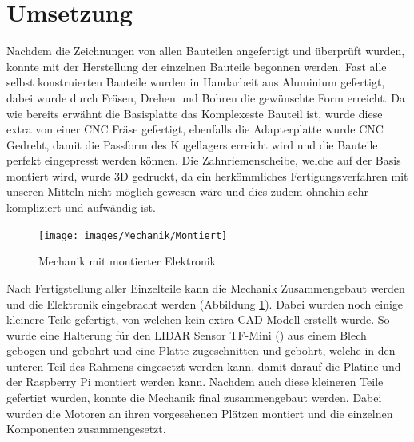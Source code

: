 \section{Umsetzung}
Nachdem die Zeichnungen von allen Bauteilen angefertigt und überprüft wurden, konnte mit der Herstellung der einzelnen Bauteile begonnen werden. Fast alle selbst konstruierten Bauteile wurden in Handarbeit aus Aluminium gefertigt, dabei wurde durch Fräsen, Drehen und Bohren die gewünschte Form erreicht. Da wie bereits erwähnt die Basisplatte das Komplexeste Bauteil ist, wurde diese extra von einer \ac{CNC} Fräse gefertigt, ebenfalls die Adapterplatte wurde \ac{CNC} Gedreht, damit die Passform des Kugellagers erreicht wird und die Bauteile perfekt eingepresst werden können. Die Zahnriemenscheibe, welche auf der Basis montiert wird, wurde \ac{3D} gedruckt, da ein herkömmliches Fertigungsverfahren mit unseren Mitteln nicht möglich gewesen wäre und dies zudem ohnehin sehr kompliziert und aufwändig ist.\\
\begin{figure}[H]
	\centering
	\texttt{[image: images/Mechanik/Montiert]}
	\caption{Mechanik mit montierter Elektronik}
	\label{monitert}
\end{figure}
Nach Fertigstellung aller Einzelteile kann die Mechanik Zusammengebaut werden und die Elektronik eingebracht werden (Abbildung \ref{monitert}). Dabei wurden noch einige kleinere Teile gefertigt, von welchen kein extra \ac{CAD} Modell erstellt wurde. So wurde eine Halterung für den \ac{LIDAR} Sensor TF-Mini () aus einem Blech gebogen und gebohrt und eine Platte zugeschnitten und gebohrt, welche in den unteren Teil des Rahmens eingesetzt werden kann, damit darauf die Platine und der Raspberry Pi montiert werden kann. Nachdem auch diese kleineren Teile gefertigt wurden, konnte die Mechanik final zusammengebaut werden. Dabei wurden die Motoren an ihren vorgesehenen Plätzen montiert und die einzelnen Komponenten zusammengesetzt.